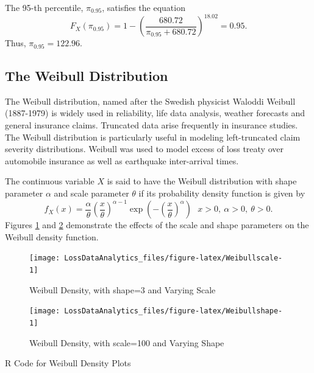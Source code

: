 \documentclass[]{book}
\begin{document}
The 95-th percentile, \(\pi_{0.95}\), satisfies the equation
\[F_{X}\left( \pi_{0.95} \right) = 1 - \left( \frac{680.72}{\pi_{0.95} + 680.72} \right)^{18.02} = 0.95.\]
Thus, \(\pi_{0.95} = 122.96\).

\subsection{The Weibull Distribution}\label{the-weibull-distribution}

The Weibull distribution, named after the Swedish physicist Waloddi
Weibull (1887-1979) is widely used in reliability, life data analysis,
weather forecasts and general insurance claims. Truncated data arise
frequently in insurance studies. The Weibull distribution is
particularly useful in modeling left-truncated claim severity
distributions. Weibull was used to model excess of loss treaty over
automobile insurance as well as earthquake inter-arrival times.

The continuous variable \(X\) is said to have the Weibull distribution
with shape parameter \(\alpha\) and scale parameter \(\theta\) if its
probability density function is given by
\[f_{X}\left( x \right) = \frac{\alpha}{\theta}\left( \frac{x}{\theta} \right)^{\alpha - 1} \exp \left(- \left( \frac{x}{\theta} \right)^{\alpha}\right) \ \ \ x > 0,\ \alpha > 0,\ \theta > 0.\]
Figures \ref{fig:Weibullscale} and \ref{fig:Weibullshape} demonstrate
the effects of the scale and shape parameters on the Weibull density
function.

\begin{figure}

{\centering \texttt{[image: LossDataAnalytics\_files/figure-latex/Weibullscale-1]} 

}

\caption{Weibull Density, with shape=3 and Varying Scale}\label{fig:Weibullscale}
\end{figure}

\begin{figure}

{\centering \texttt{[image: LossDataAnalytics\_files/figure-latex/Weibullshape-1]} 

}

\caption{Weibull Density, with scale=100 and Varying Shape}\label{fig:Weibullshape}
\end{figure}

R Code for Weibull Density Plots
\end{document}
